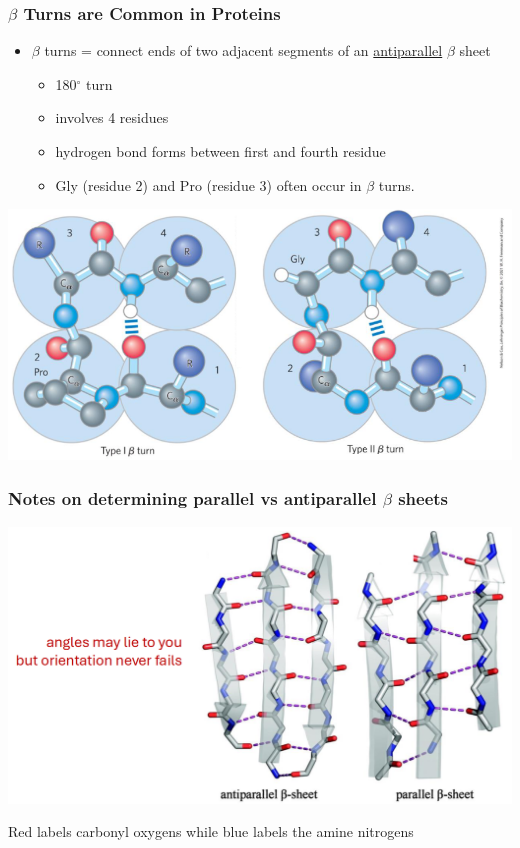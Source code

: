 \documentclass[10pt]{article}
\begin{document}
\subsubsection*{$\beta$ Turns are Common in Proteins}
\begin{itemize}
    \item $\beta$ turns = connect ends of two adjacent segments of an \underline{antiparallel} $\beta$ sheet
    \begin{itemize}
        \item 180$^\circ$ turn
        \item involves 4 residues
        \item hydrogen bond forms between first and fourth residue
        \item Gly (residue 2) and Pro (residue 3) often occur in $\beta$ turns.
    \end{itemize}
\end{itemize}
\begin{center}
    \includegraphics*[width=\textwidth]{L4_4.png}
\end{center}

\subsubsection*{Notes on determining parallel vs antiparallel $\beta$ sheets}
\begin{center}
    \includegraphics*[width=\textwidth]{L4_5.png}
\end{center}
Red labels carbonyl oxygens while blue labels the amine nitrogens
\end{document}
